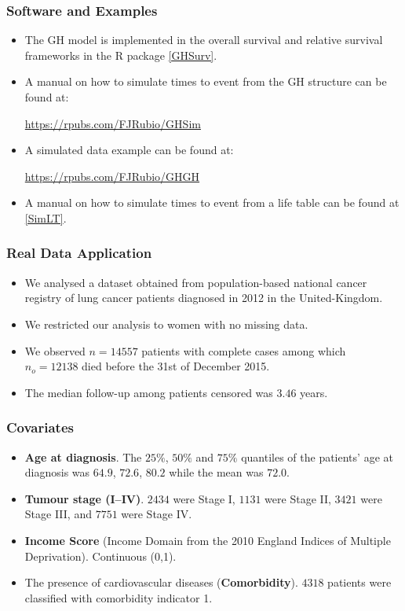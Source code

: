 \documentclass[10pt,handout,compress]{beamer}
\begin{document}
\begin{frame}
\frametitle{Software and Examples}
\begin{itemize}
\item The GH model is implemented in the overall survival and relative survival frameworks in the R package \href{https://github.com/FJRubio67/GHSurv}{[GHSurv]}.

\item A manual on how to simulate times to event from the GH structure can be found at:

\url{https://rpubs.com/FJRubio/GHSim}

\item A simulated data example can be found at:

\url{https://rpubs.com/FJRubio/GHGH}

\item A manual on how to simulate times to event from a life table can be found at \href{https://github.com/FJRubio67/SimLT}{[SimLT]}.
\end{itemize}
\end{frame}

\begin{frame}
\frametitle{Real Data Application}
\begin{itemize}
\item We analysed a dataset obtained from population-based national cancer registry of lung cancer patients diagnosed in 2012 in the United-Kingdom.
\pause
\item We restricted our analysis to women with no missing data.
\pause
\item We observed $n = 14557$ patients with complete cases among which $n_o = 12138$ died before the 31st of December 2015.
\pause
\item The median follow-up among patients censored was $3.46$ years.
\end{itemize}
\end{frame}

\begin{frame}
\frametitle{Covariates}
\begin{itemize}
\item \textbf{Age at diagnosis}. The $25\%$, $50\%$ and $75\%$ quantiles of the patients' age at diagnosis was $64.9$, $72.6$, $80.2$ while the mean was $72.0$.
\item \textbf{Tumour stage (I--IV)}. $2434$ were Stage I, $1131$ were Stage II, $3421$ were Stage III, and $7751$ were Stage IV. 
\item \textbf{Income Score} (Income Domain from the 2010 England Indices of Multiple Deprivation). Continuous (0,1).
\item The presence of cardiovascular diseases (\textbf{Comorbidity}). $4318$ patients were classified with comorbidity indicator 1. 
\end{itemize}
\end{frame}
\end{document}
